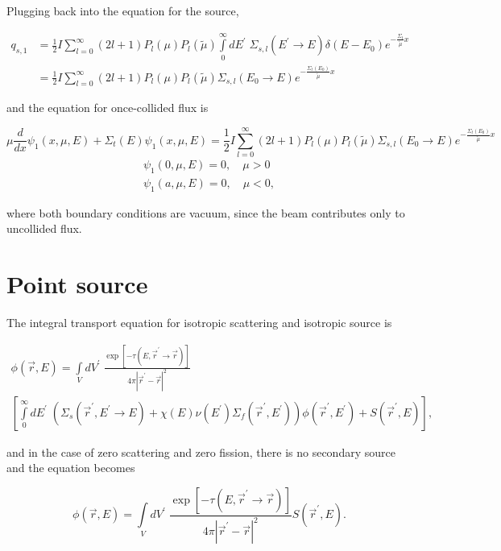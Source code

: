 \documentclass{hw-template}
\newcommand{\p}{^\prime}
\begin{document}
Plugging back into the equation for the source,

\begin{align}
    q_{s, 1} &= \frac{1}{2}I\sum_{l=0}^\infty (2l + 1)P_l(\mu)P_l(\tilde{\mu}) \int\limits_{0}^{\infty}dE\p\; \Sigma_{s,l}(E\p \rightarrow E)\delta(E-E_0) e^{-\frac{\Sigma_t}{\tilde{\mu}}x}\\
    &= \frac{1}{2}I\sum_{l=0}^\infty (2l + 1)P_l(\mu)P_l(\tilde{\mu})  \Sigma_{s,l}(E_0 \rightarrow E)e^{-\frac{\Sigma_t(E_0)}{\tilde{\mu}}x}
\end{align}


and the equation for once-collided flux is

\begin{equation}
    \mu \frac{d}{dx}\psi_1(x, \mu, E) + \Sigma_t(E)\psi_1(x, \mu, E) =  \frac{1}{2}I\sum_{l=0}^\infty (2l + 1)P_l(\mu)P_l(\tilde{\mu})  \Sigma_{s,l}(E_0 \rightarrow E)e^{-\frac{\Sigma_t(E_0)}{\tilde{\mu}}x}
\end{equation}
\begin{gather}
    \psi_1(0, \mu, E) = 0, \quad \mu > 0\\
    \psi_1(a, \mu, E) = 0, \quad \mu < 0,
\end{gather}

where both boundary conditions are vacuum, since the beam contributes only to uncollided flux.

\section{Point source}

The integral transport equation for isotropic scattering and isotropic source is

\begin{multline}
    \phi(\vec{r}, E) = \int\limits_V dV\p\; \frac{\exp\left[-\tau(E, \vec{r}\p \rightarrow \vec{r}) \right]}{4\pi \left|\vec{r}\p - \vec{r}\right|^2}\\
    \left[\int\limits_0^\infty dE\p\; \left(\Sigma_s(\vec{r}\p, E\p \rightarrow E) + \chi(E)\nu(E\p)\Sigma_f(\vec{r}\p, E\p) \right)\phi(\vec{r}\p, E\p) + S(\vec{r}\p, E) \right],
\end{multline}

and in the case of zero scattering and zero fission, there is no secondary source and the equation becomes

\begin{equation}
    \phi(\vec{r}, E) = \int\limits_V dV\p\; \frac{\exp\left[-\tau(E, \vec{r}\p \rightarrow \vec{r}) \right]}{4\pi \left|\vec{r}\p - \vec{r}\right|^2}S(\vec{r}\p, E).
\end{equation}
\end{document}
